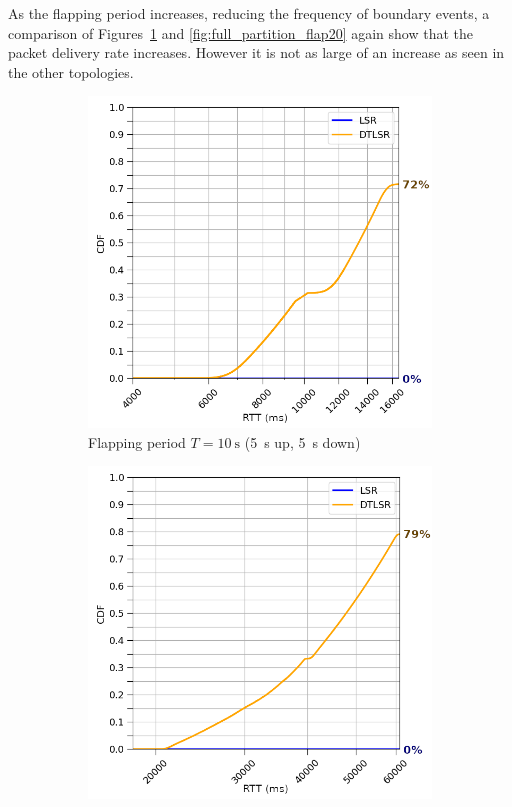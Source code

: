 \documentclass[withindex,glossary,openany]{cam-thesis}
\begin{document}
As the flapping period increases, reducing the frequency of boundary events, a comparison of Figures~\ref{fig:full_partition_flap5} and \ref{fig:full_partition_flap20} again show that the packet delivery rate increases. However it is not as large of an increase as seen in the other topologies.

\begin{figure}[H]
\centering
\begin{subfigure}{.5\textwidth}
  \includegraphics[width=1\linewidth]{delay_full_partition_flap5}
  \caption{Flapping period $T=\SI{10}{\s}$ (\SI{5}{\s} up, \SI{5}{\s} down)}
  \label{fig:full_partition_flap5}
\end{subfigure}%
\begin{subfigure}{.5\textwidth}
  \includegraphics[width=1\linewidth]{delay_full_partition_flap20}

\end{subfigure}
\end{figure}
\end{document}
